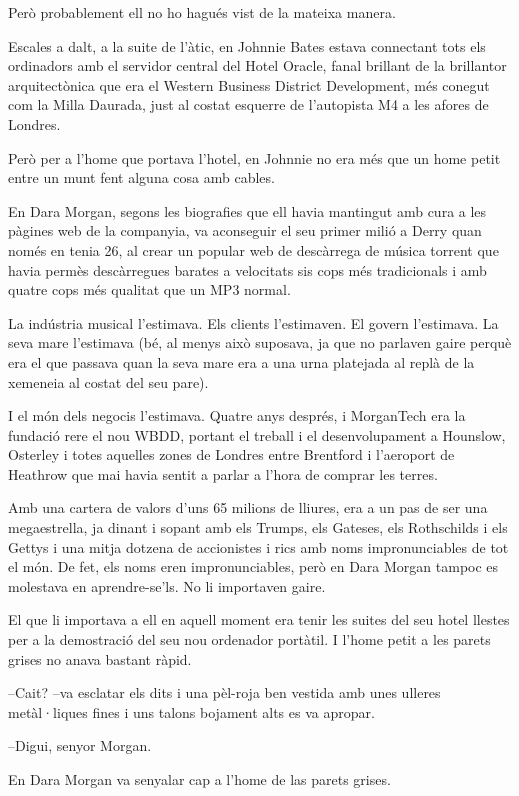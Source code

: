 Però probablement ell no ho hagués vist de la mateixa manera.

Escales a dalt, a la suite de l'àtic, en Johnnie Bates estava connectant
tots els ordinadors amb el servidor central del Hotel Oracle, fanal
brillant de la brillantor arquitectònica que era el Western Business
District Development, més conegut com la Milla Daurada, just al costat
esquerre de l'autopista M4 a les afores de Londres.

Però per a l'home que portava l'hotel, en Johnnie no era més que un home
petit entre un munt fent alguna cosa amb cables.

En Dara Morgan, segons les biografies que ell havia mantingut amb cura a
les pàgines web de la companyia, va aconseguir el seu primer milió a
Derry quan només en tenia 26, al crear un popular web de descàrrega de
música torrent que havia permès descàrregues barates a velocitats sis
cops més tradicionals i amb quatre cops més qualitat que un MP3 normal.

La indústria musical l'estimava. Els clients l'estimaven. El govern
l'estimava. La seva mare l'estimava (bé, al menys això suposava, ja que
no parlaven gaire perquè era el que passava quan la seva mare era a una
urna platejada al replà de la xemeneia al costat del seu pare).

I el món dels negocis l'estimava. Quatre anys després, i MorganTech era
la fundació rere el nou WBDD, portant el treball i el desenvolupament a
Hounslow, Osterley i totes aquelles zones de Londres entre Brentford i
l'aeroport de Heathrow que mai havia sentit a parlar a l'hora de comprar
les terres.

Amb una cartera de valors d'uns 65 milions de lliures, era a un pas de
ser una megaestrella, ja dinant i sopant amb els Trumps, els Gateses,
els Rothschilds i els Gettys i una mitja dotzena de accionistes i rics
amb noms impronunciables de tot el món. De fet, els noms eren
impronunciables, però en Dara Morgan tampoc es molestava en
aprendre-se'ls. No li importaven gaire.

El que li importava a ell en aquell moment era tenir les suites del seu
hotel llestes per a la demostració del seu nou ordenador portàtil. I
l'home petit a les parets grises no anava bastant ràpid.

--Cait? --va esclatar els dits i una pèl-roja ben vestida amb unes
ulleres metàl·liques fines i uns talons bojament alts es va apropar.

--Digui, senyor Morgan.

En Dara Morgan va senyalar cap a l'home de las parets grises.

